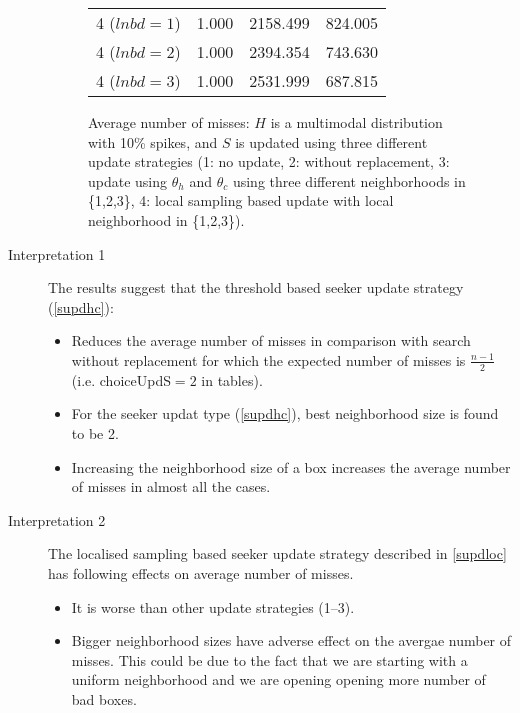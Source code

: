\documentclass[11pt,a4paper,draft]{article}
\begin{document}
\begin{description}
\begin{figure}[!h]
\begin{tabular}{llll}
		4 ($lnbd=1$) & 1.000 & 2158.499 & 824.005 \\
		4 ($lnbd=2$) & 1.000 & 2394.354 & 743.630 \\
		4 ($lnbd=3$) & 1.000 & 2531.999 & 687.815 \\
		\hline 
		\hline 
	\end{tabular}
	\caption{Average number of misses: $H$ is a multimodal distribution with 10\% spikes, and $S$ is updated using three different update strategies (1: no update, 2: without replacement, 3: update using $\theta_h$ and $\theta_c$ using three different neighborhoods in \{1,2,3\}, 4: local sampling based update with local neighborhood in \{1,2,3\}).}
	\end{figure}

	\item[Interpretation 1] The results suggest that the threshold based seeker update strategy (\ref{supdhc}):
	\begin{itemize}
		\item Reduces the average number of misses in comparison with search without replacement for which the expected number of misses is $\frac{n-1}{2}$ (i.e. choiceUpdS$=2$ in tables).
		\item For the seeker updat type (\ref{supdhc}), best neighborhood size is found to be 2. 
		\item Increasing the neighborhood size of a box increases the average number of misses in almost all the cases.
	\end{itemize}

	\item[Interpretation 2] The localised sampling based seeker update strategy described in \ref{supdloc} has following effects on average number of misses.
	\begin{itemize}
		\item It is worse than other update strategies (1--3).
		\item Bigger neighborhood sizes have adverse effect on the avergae number of misses. This could be due to the fact that we are starting with a uniform neighborhood and we are opening opening more number of bad boxes.
	\end{itemize}
	
\end{description}


	
\end{document}
